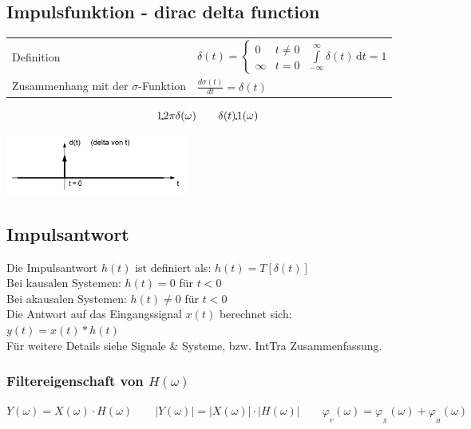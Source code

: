 \subsection{Impulsfunktion - dirac delta function}
	\begin{minipage}{10cm}
		\begin{tabular}{l l}
		Definition & $\delta (t)=\begin{cases} 0 & t\ne 0\\\infty & t=0\end{cases}$ \qquad $\int\limits_{-\infty}^\infty \delta(t) \, \mathrm dt = 1 $\\
		\parbox{3cm}{Zusammenhang mit der $\sigma$-Funktion} & $\frac{d\sigma(t)}{dt}=\delta(t)$ \\
		\end{tabular}
		\[
			1 \FT 2\pi \delta(\omega) \qquad \delta(t) \FT 1(\omega)
		\]
	\end{minipage}
	\begin{minipage}{8cm}
		\includegraphics[width=6cm]{./bilder/diracimpulse.png}
	\end{minipage}

	\subsection{Impulsantwort }
		Die Impulsantwort $h(t)$ ist definiert als: $h(t) = T[\delta(t)] $ \\
		\hspace*{0.5cm} Bei kausalen Systemen: $h(t) = 0$ für $t < 0$ \\   
		\hspace*{0.5cm} Bei akausalen Systemen: $h(t) \neq 0$ für $t < 0$\\ 
		Die Antwort auf das Eingangssignal $x(t)$ berechnet sich: $y(t) = x(t) * h(t)$ \\
		
		Für weitere Details siehe Signale \& Systeme, bzw. IntTra Zusammenfassung.
		
		\subsubsection{Filtereigenschaft von $H(\omega)$}
			$ Y(\omega) = X(\omega) \cdot H(\omega)
				\qquad |Y(\omega)| = |X(\omega)| \cdot |H(\omega)|
				\qquad \varphi_{_Y}(\omega) = \varphi_{_X}(\omega) + \varphi_{_H}(\omega)$
		
